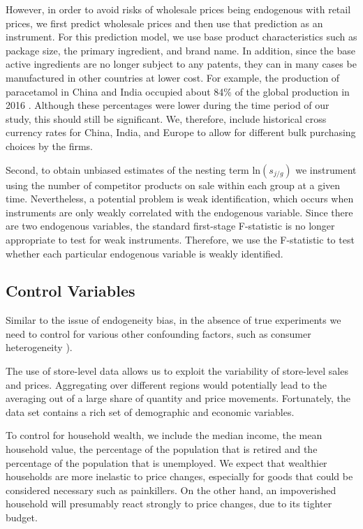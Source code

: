 \documentclass[12pt, authoryear]{elsarticle}
\begin{document}
However, in order to avoid risks of wholesale prices being endogenous with retail prices, we first predict wholesale prices and then use that prediction as an instrument. For this prediction model, we use base product characteristics such as package size, the primary ingredient, and brand name. In addition, since the base active ingredients are no longer subject to any patents, they can in many cases be manufactured in other countries at lower cost. For example, the production of paracetamol in China and India occupied about 84\% of the global production in 2016 \citep{Information}. Although these percentages were lower during the time period of our study, this should still be significant. We, therefore, include historical cross currency rates for China, India, and Europe to allow for different bulk purchasing choices by the firms.

Second, to obtain unbiased estimates of the nesting term  ln$\left( s _ { j / g  } \right)$  we  instrument using the number of competitor products on sale within each group at a given time. Nevertheless, a potential problem is weak identification, which occurs when instruments
are only weakly correlated with the endogenous variable. Since there are two endogenous variables, the standard first-stage F-statistic is no longer appropriate to test for weak instruments. Therefore, we use the \cite{sanderson2016weak} F-statistic to test whether each particular endogenous variable is weakly identified.

\subsection{Control Variables}

Similar to the issue of endogeneity bias, in the absence of true experiments we need to control for various other confounding factors, such as consumer heterogeneity \cite{chintagunta_balancing_2003}).

The use of store-level data allows us to exploit the variability of store-level sales and prices. Aggregating over different regions would potentially lead to the averaging out of a large share of quantity and price movements. Fortunately, the data set contains a rich set of demographic and economic variables. 

To control for household wealth, we include the median income, the mean household value, the percentage of the population that is retired and the percentage of the population that is unemployed. We expect that wealthier households are more inelastic to price changes, especially for goods that could be considered necessary such as painkillers. On the other hand, an impoverished household will presumably react strongly to price changes, due to its tighter budget.
\end{document}
